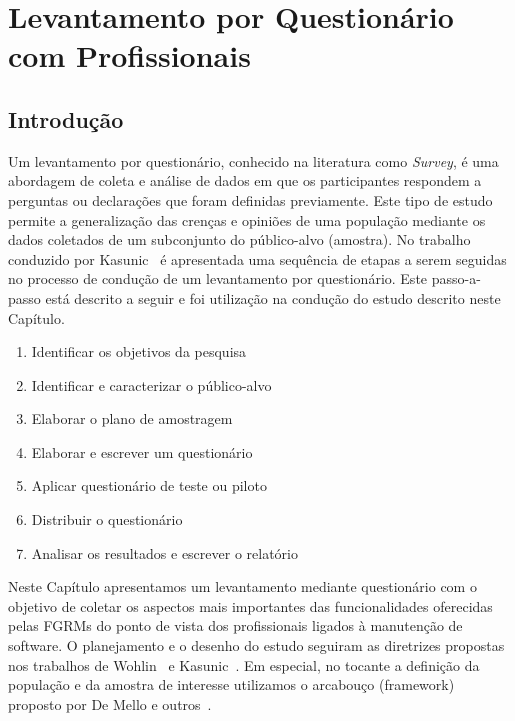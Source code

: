 \chapter{Levantamento por Questionário com Profissionais}
\label{ch:pesquisa-profissionais}

\section{Introdução}
\label{sec:pesquisa-profissionais-intro}

Um levantamento por questionário, conhecido na literatura como \textit{Survey},
é uma abordagem de coleta e análise de dados em que os participantes respondem a
perguntas ou declarações que foram definidas previamente. Este tipo de estudo
permite a generalização das crenças e opiniões de uma população mediante os
dados coletados de um subconjunto do público-alvo (amostra). No trabalho
conduzido por Kasunic~\cite{kasunic2005designing} é apresentada uma sequência de
etapas a serem seguidas no processo de condução de um levantamento por
questionário. Este passo-a-passo está descrito a seguir e foi utilização na
condução do estudo descrito neste Capítulo.

\begin{enumerate}
    \item{Identificar os objetivos da pesquisa}
    \item{Identificar e caracterizar o público-alvo}
    \item{Elaborar o plano de amostragem}
    \item{Elaborar e escrever um questionário}
    \item{Aplicar questionário de teste ou piloto}
    \item{Distribuir o questionário}
    \item{Analisar os resultados e escrever o relatório}
\end{enumerate}

Neste Capítulo apresentamos um levantamento mediante questionário com o objetivo
de coletar os aspectos mais importantes das funcionalidades oferecidas pelas
FGRMs do ponto de vista dos profissionais ligados à manutenção de software. O
planejamento e o desenho do estudo seguiram as diretrizes propostas nos
trabalhos de Wohlin~\cite{wohlin2012experimentation} e
Kasunic~\cite{kasunic2005designing}. Em especial, no tocante a definição da
população e da amostra de interesse utilizamos o arcabouço (framework) proposto
por De Mello e outros~\cite{de2015investigating, de2014towards}.

